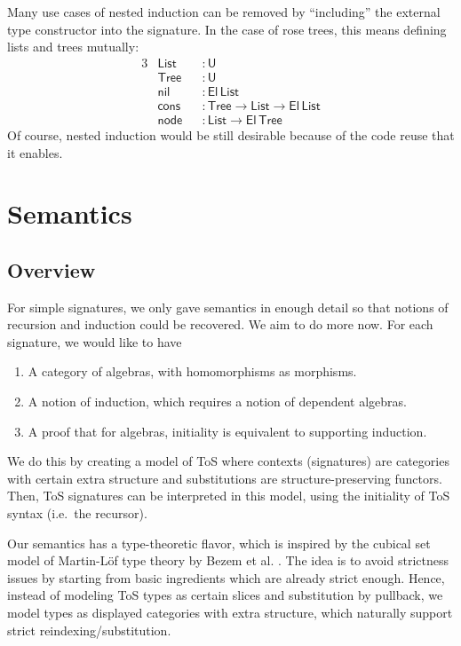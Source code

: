 \documentclass[12pt,a4paper,twoside,openany]{book}
\theoremstyle{remark}
\theoremstyle{definition}
\theoremstyle{theorem}
\newcommand{\ms}[1]{\mathsf{#1}}
\newcommand{\U}{\mathsf{U}}
\newcommand{\El}{\mathsf{El}}
\begin{document}
Many use cases of nested induction can be removed by ``including'' the external
type constructor into the signature. In the case of rose trees, this means
defining lists and trees mutually:
\begin{alignat*}{3}
  &\ms{List} &&: \U\\
  &\ms{Tree} &&: \U\\
  &\ms{nil}  &&: \El\,\ms{List}\\
  &\ms{cons} &&: \ms{Tree} \to \ms{List} \to \El\,\ms{List}\\
  &\ms{node} &&: \ms{List} \to \El\,\ms{Tree}
\end{alignat*}
Of course, nested induction would be still desirable because of the code reuse
that it enables.

\section{Semantics}
\label{sec:fqiit-semantics}

\subsection{Overview}

For simple signatures, we only gave semantics in enough detail so that notions
of recursion and induction could be recovered. We aim to do more now. For each
signature, we would like to have
\begin{enumerate}
  \item A category of algebras, with homomorphisms as morphisms.
  \item A notion of induction, which requires a notion of dependent algebras.
  \item A proof that for algebras, initiality is equivalent to supporting induction.
\end{enumerate}

We do this by creating a model of ToS where contexts (signatures) are categories
with certain extra structure and substitutions are structure-preserving
functors. Then, ToS signatures can be interpreted in this model, using the
initiality of ToS syntax (i.e.\ the recursor).

Our semantics has a type-theoretic flavor, which is inspired by the cubical set
model of Martin-Löf type theory by Bezem et al. \cite{cubical}. The idea is
to avoid strictness issues by starting from basic ingredients which are already
strict enough. Hence, instead of modeling ToS types as certain slices and
substitution by pullback, we model types as displayed categories with extra
structure, which naturally support strict reindexing/substitution.
\end{document}
